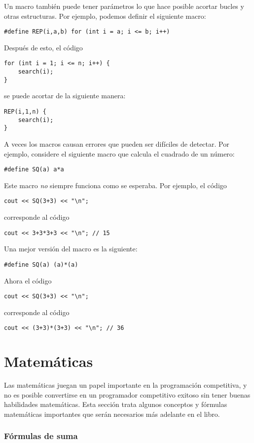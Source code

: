 Un macro también puede tener parámetros
lo que hace posible acortar bucles y otras
estructuras.
Por ejemplo, podemos definir el siguiente macro:
\begin{lstlisting}
#define REP(i,a,b) for (int i = a; i <= b; i++)
\end{lstlisting}
Después de esto, el código
\begin{lstlisting}
for (int i = 1; i <= n; i++) {
    search(i);
}
\end{lstlisting}
se puede acortar de la siguiente manera:
\begin{lstlisting}
REP(i,1,n) {
    search(i);
}
\end{lstlisting}

A veces los macros causan errores que pueden ser difíciles
de detectar. Por ejemplo, considere el siguiente macro
que calcula el cuadrado de un número:
\begin{lstlisting}
#define SQ(a) a*a
\end{lstlisting}
Este macro \emph{no} siempre funciona como se esperaba.
Por ejemplo, el código
\begin{lstlisting}
cout << SQ(3+3) << "\n";
\end{lstlisting}
corresponde al código
\begin{lstlisting}
cout << 3+3*3+3 << "\n"; // 15
\end{lstlisting}

Una mejor versión del macro es la siguiente:
\begin{lstlisting}
#define SQ(a) (a)*(a)
\end{lstlisting}
Ahora el código
\begin{lstlisting}
cout << SQ(3+3) << "\n";
\end{lstlisting}
corresponde al código
\begin{lstlisting}
cout << (3+3)*(3+3) << "\n"; // 36
\end{lstlisting}

\section{Matemáticas}

Las matemáticas juegan un papel importante en la
programación competitiva, y no es posible convertirse
en un programador competitivo exitoso sin
tener buenas habilidades matemáticas.
Esta sección trata algunos conceptos y fórmulas
matemáticas importantes que
serán necesarios más adelante en el libro.

\subsubsection{Fórmulas de suma}

